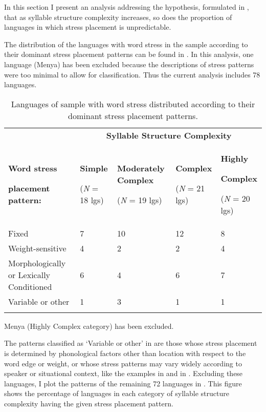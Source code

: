   In this section I present an analysis addressing the hypothesis, formulated in , that as syllable structure complexity increases, so does the proportion of languages in which stress placement is unpredictable.

  The distribution of the languages with word stress in the sample according to their dominant stress placement patterns can be found in . In this analysis, one language (Menya) has been excluded because the descriptions of stress patterns were too minimal to allow for classification. Thus the current analysis includes 78 languages.

\begin{table}
\begin{tabularx}{\textwidth}{XXXXX}
\lsptoprule
 & \multicolumn{4}{c}{ \textbf{Syllable Structure Complexity}}\\
{ \textbf{Word stress} }

 \textbf{placement pattern:} & { \textbf{Simple}}

 (\textit{N} = 18 lgs) & { \textbf{Moderately Complex}}

 (\textit{N} = 19 lgs) & { \textbf{Complex}}

 (\textit{N} = 21 lgs) & { \textbf{Highly} }

{ \textbf{Complex}}

 (\textit{N} = 20 lgs)\\
 Fixed & 7 & 10 & 12 & 8\\
 Weight-sensitive & 4 & 2 & 2 & 4\\
 Morphologically or Lexically Conditioned & 6 & 4 & 6 & 7\\
 Variable or other & 1 & 3 & 1 & 1\\
\lspbottomrule
\end{tabularx}
\caption{\label{tab:5.4}Languages of sample with word stress distributed according to their dominant stress placement patterns.}Menya (Highly Complex category) has been excluded.
\end{table}

  The patterns classified as ‘Variable or other’ in  are those whose stress placement is determined by phonological factors other than location with respect to the word edge or weight, or whose stress patterns may vary widely according to speaker or situational context, like the examples in  and  in . Excluding these languages, I plot the patterns of the remaining 72 languages in . This figure shows the percentage of languages in each category of syllable structure complexity having the given stress placement pattern.

